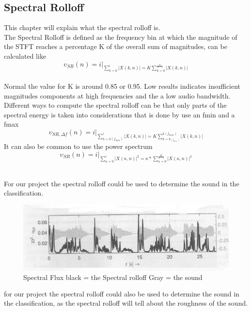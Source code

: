 \subsection{Spectral Rolloff}
This chapter will explain what the spectral rolloff is.\\
The Spectral Rolloff is defined as the frequency bin at which the magnitude of the STFT reaches a percentage K of the overall sum of magnitudes, can be calculated like\citep{ACA}\\
\begin{equation}\label{ eq:normal spectral rolloff}
	\upsilon_{SR}(n) = i \vert _{\displaystyle\sum_{k = 0}^i \vert X(k, n) \vert = K  \displaystyle\sum_{k = 0}^ {\frac{\kappa}{2-1}}\vert X(k, n) \vert}
\end{equation}
\\
Normal the value for K is around 0.85 or 0.95. Low results indicates insufficient magnitudes components at high frequencies and the a low audio bandwidth\citep{ACA}.\\
Different ways to compute the spectral rolloff can be that only parts of the spectral energy is taken into considerations that is done by use an fmin and a fmax\citep{ACA}
\begin{equation}\label{ eq: fmin and fmax spectral rolloff}
	\upsilon_{SR, \Delta f}(n) = i \vert _{\displaystyle\sum_{k = k(f_{min})}^i \vert X(k, n) \vert = K \displaystyle\sum_{k = k_(f_{min})}^ {k(f_{max})}\vert X(k, n) \vert}
\end{equation}
It can also be common to use the power spectrum
\begin{equation}\label{ eq:power spectral rolloff}
	\upsilon_{SR}(n) = i \vert _{\displaystyle\sum_{\kappa = 0}^i \vert X(\kappa, n) \vert^2 = \kappa * \displaystyle\sum_{\kappa = 0}^ {\frac{K}{2-1}}\vert X(\kappa, n) \vert^2}
\end{equation}

\\
For our project the spectral rolloff could be used to determine the sound in the classification. 

\begin{figure}[h]
	\begin{center}
		\includegraphics[scale = 0.5]{fig/spectral_rolloff.jpg}
		\caption{Spectral Flux black = the Spectral rolloff Gray = the sound \citep{ACA}}
		\label{Spectral rolloff pic}
	\end{center}
\end{figure}
for our project the spectral rolloff could also be used to determine the sound in the classification, as the spectral rolloff will tell about the roughness of the sound. 


